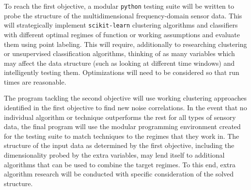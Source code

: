 To reach the first objective, a modular \texttt{python} testing suite will be written to probe the structure of the multidimensional frequency-domain sensor data.
This will strategically implement \texttt{scikit-learn} clustering algorithms and classifiers with different optimal regimes of function or working assumptions and evaluate them using point labeling. 
This will require, additionally to researching clustering or unsupervised classification algorithms, thinking of as many variables which may affect the data structure (such as looking at different time windows) and intelligently testing them. 
Optimizations will need to be considered so that run times are reasonable.

The program tackling the second objective will use working clustering approaches identified in the first objective to find new noise correlations.
In the event that no individual algorithm or technique outperforms the rest for all types of sensory data, the final program will use the modular programming environment created for the testing suite to match techniques to the regimes that they work in.
The structure of the input data as determined by the first objective, including the dimensionality probed by the extra variables, may lend itself to additional algorithms that can be used to combine the target regimes.
To this end, extra algorithm research will be conducted with specific consideration of the solved structure.
